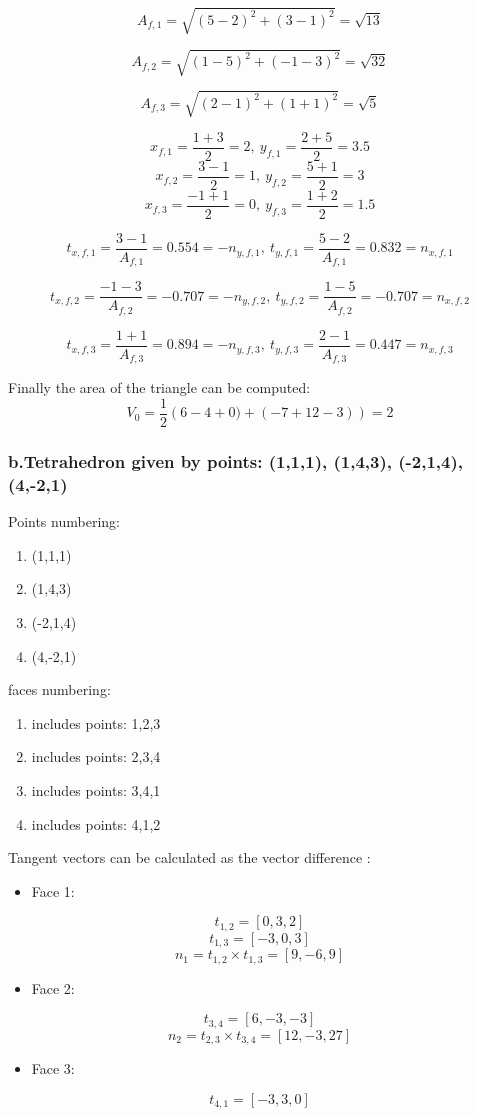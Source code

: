 \documentclass[11pt]{article}
\begin{document}
\[
 A_{f,1} = \sqrt{(5-2)^{2} + (3-1)^{2}} = \sqrt{13}
 \]

\[
 A_{f,2} = \sqrt{(1-5)^{2} + (-1-3)^{2}} = \sqrt{32}
 \]

\[
 A_{f,3} = \sqrt{(2-1)^{2} + (1+1)^{2}} = \sqrt{5}
 \]

\[
 x_{f,1} = \frac{1+3}{2}=2, \  y_{f,1} = \frac{2+5}{2}=3.5 
 \]
\[
 x_{f,2} = \frac{3-1}{2}=1, \  y_{f,2} = \frac{5+1}{2}=3 
 \]
\[
 x_{f,3} = \frac{-1+1}{2}=0, \  y_{f,3} = \frac{1+2}{2}=1.5 
 \]

\[
 t_{x,f,1} = \frac{3-1}{A_{f,1}} = 0.554 = -n_{y,f,1}, \ t_{y,f,1} = \frac{5-2}{A_{f,1}} = 0.832 = n_{x,f,1}
 \]

\[
 t_{x,f,2} = \frac{-1-3}{A_{f,2}} = -0.707 = -n_{y,f,2} , \ t_{y,f,2} = \frac{1-5}{A_{f,2}} = -0.707 = n_{x,f,2}
 \]

\[
 t_{x,f,3} = \frac{1+1}{A_{f,3}} = 0.894 = -n_{y,f,3}, \ t_{y,f,3} = \frac{2-1}{A_{f,3}} = 0.447 = n_{x,f,3}
 \]

Finally the area of the triangle can be computed:
\[
 V_{0}=\frac{1}{2} \left( 6- 4 +0) + (-7 + 12 -3) \right) = 2
 \]

\subsubsection{b.Tetrahedron given by points: (1,1,1), (1,4,3), (-2,1,4), (4,-2,1)}
\label{sec:orgdb2802e}
Points numbering:
\begin{enumerate}
\item (1,1,1)
\item (1,4,3)
\item (-2,1,4)
\item (4,-2,1)
\end{enumerate}

faces numbering:
\begin{enumerate}
\item includes points: 1,2,3
\item includes points: 2,3,4
\item includes points: 3,4,1
\item includes points: 4,1,2
\end{enumerate}

Tangent vectors can be calculated as the vector difference :
\begin{itemize}
\item Face 1:
\end{itemize}
\[
t_{1,2} = [0,3,2]
\]
\[
t_{1,3} = [-3,0,3]
\]
\[
n_{1} = t_{1,2} \times t_{1,3}= [9,-6,9]
\]
\begin{itemize}
\item Face 2:
\end{itemize}
\[
t_{3,4} = [6,-3,-3]
\]
\[
n_{2} = t_{2,3} \times t_{3,4}= [12,-3,27]
\]
\begin{itemize}
\item Face 3:
\end{itemize}
\[
t_{4,1} = [-3,3,0]
\]
\end{document}
